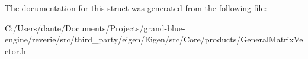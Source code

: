 The documentation for this struct was generated from the following file\+:\begin{DoxyCompactItemize}
\item 
C\+:/\+Users/dante/\+Documents/\+Projects/grand-\/blue-\/engine/reverie/src/third\+\_\+party/eigen/\+Eigen/src/\+Core/products/General\+Matrix\+Vector.\+h\end{DoxyCompactItemize}
